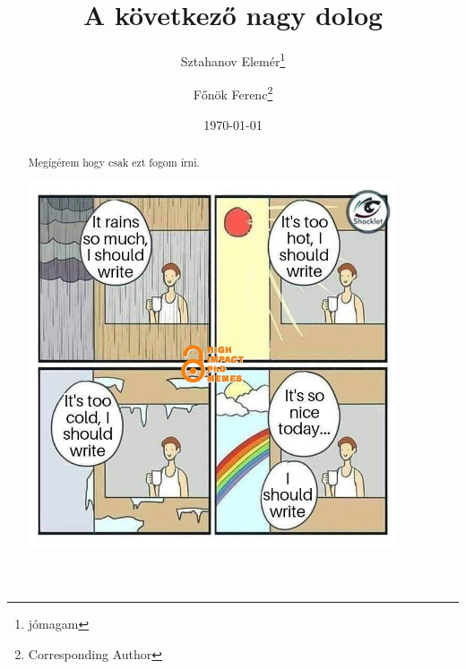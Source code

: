 \documentclass[12pt,a4paper,titlepage,twoside]{article} %
\title{\textbf{A következő nagy dolog}}
\author{Sztahanov Elemér\thanks{jómagam} \and Főnök Ferenc\thanks{Corresponding Author}}
\date{\today}
\begin{document}
\maketitle

\begin{abstract}
Megígérem hogy csak ezt fogom írni.
\begin{center}	%
	\includegraphics[width=0.9\textwidth, angle=5]{figs/71795715_2451578561753126_9033394225919557632_n.jpg}
\end{center}
\end{abstract}
\end{document}
